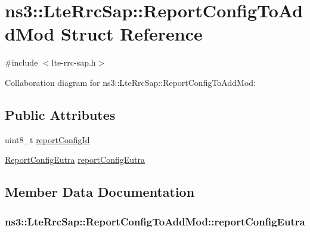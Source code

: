 \hypertarget{structns3_1_1LteRrcSap_1_1ReportConfigToAddMod}{}\section{ns3\+:\+:Lte\+Rrc\+Sap\+:\+:Report\+Config\+To\+Add\+Mod Struct Reference}
\label{structns3_1_1LteRrcSap_1_1ReportConfigToAddMod}


{\ttfamily \#include $<$lte-\/rrc-\/sap.\+h$>$}



Collaboration diagram for ns3\+:\+:Lte\+Rrc\+Sap\+:\+:Report\+Config\+To\+Add\+Mod\+:
\subsection*{Public Attributes}
\begin{DoxyCompactItemize}
\item 
uint8\+\_\+t \hyperlink{structns3_1_1LteRrcSap_1_1ReportConfigToAddMod_a07f0037bf344c284be4506a0b90998b2}{report\+Config\+Id}
\item 
\hyperlink{structns3_1_1LteRrcSap_1_1ReportConfigEutra}{Report\+Config\+Eutra} \hyperlink{structns3_1_1LteRrcSap_1_1ReportConfigToAddMod_a23af6939ee414f09596a1f8bd96a9cf4}{report\+Config\+Eutra}
\end{DoxyCompactItemize}


\subsection{Member Data Documentation}
\subsubsection[{\texorpdfstring{report\+Config\+Eutra}{reportConfigEutra}}]{ ns3\+::\+Lte\+Rrc\+Sap\+::\+Report\+Config\+To\+Add\+Mod\+::report\+Config\+Eutra}\hypertarget{structns3_1_1LteRrcSap_1_1ReportConfigToAddMod_a23af6939ee414f09596a1f8bd96a9cf4}{}\label{structns3_1_1LteRrcSap_1_1ReportConfigToAddMod_a23af6939ee414f09596a1f8bd96a9cf4}

